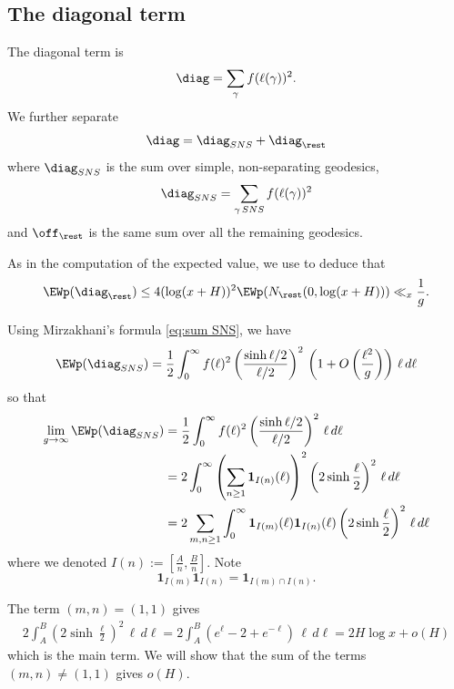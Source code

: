\documentclass[12pt]{amsart}
\begin{document}
\subsection{The diagonal term}
The diagonal term is 
\[
\diag  = \sum_\gamma f(\ell(\gamma))^2. 
\]
We further separate 
\[
\diag = \diag_{SNS} + \diag_{\rest}
\]
where $\diag_{SNS} $ is the sum over simple, non-separating geodesics, 
\[
\diag_{SNS} = \sum_{\gamma \, SNS} f( \ell(\gamma))^2 
\]
and $\off_{\rest} $ is the same sum over all the remaining geodesics. 


As in the computation of the expected value, we use  \cite{MP} to deduce that 
\[
\EWp(\diag_{\rest}) \leq 4 ( \log(x+H))^2\EWp( N_{\rest}(0, \log(x+H))) \ll_x\frac 1g. 
\]




 
Using Mirzakhani's formula \eqref{eq:sum SNS}, we have
\[
\EWp(\diag_{SNS}) =  \frac 12 \int_{0}^{\infty} f(\ell)^2   \left( \frac{\sinh \ell/2}{\ell/2} \right)^2\,\left( 1+O\left( \frac{\ell^2}{g} \right) \right)  \, \ell \, d\ell 
\]
so that 
\begin{equation} \label{sum over m and n}
\begin{split}
\lim_{g\to \infty}\EWp(\diag_{SNS}) 
&=  \frac 12 \int_{0}^{\infty} f(\ell)^2  \left( \frac{\sinh \ell/2}{\ell/2} \right)^2\,\ell\,d\ell 
\\
&=
2\int_{0}^{\infty} \left(\sum_{n\geq 1} \mathbf 1_{I(n)}(\ell)  \right)^2  \left(2\sinh \frac \ell 2 \right)^2\, \ell \, d\ell 
\\
&=2\sum_{ m,n\geq 1} \int_0^\infty 
\mathbf 1_{I(m)}(\ell) \mathbf 1_{I(n)}(\ell) \left(2\sinh \frac \ell 2 \right)^2 \, \ell \, d\ell 
\end{split}
\end{equation}
where we denoted   $I(n):=[\frac An, \frac Bn]$. 
Note 
\[
\mathbf 1_{I(m)} \mathbf 1_{I(n)} = \mathbf 1_{I(m)\cap I(n)}.
\] 

 The term $(m,n)=(1,1)$ gives 
\begin{multline*}
2\int_A^B   \left(2\sinh \frac \ell 2\right)^2 \, \ell \, d\ell   = 2\int_A^B (e^\ell-2+e^{-\ell}) \,\ell \, d\ell 
  =2H\log x + o(H)  
\end{multline*}
which is the main term.
We will  show that the sum of the terms $(m,n)\neq (1,1)$ gives $o(H)$.  
\end{document}
